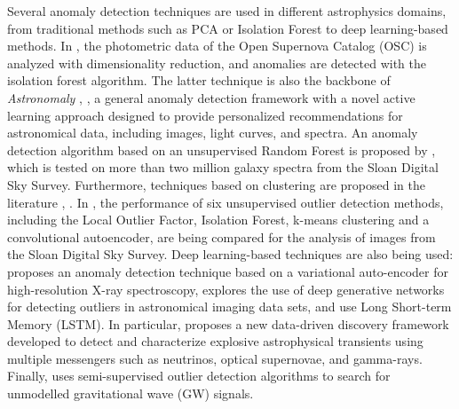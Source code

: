 Several anomaly detection techniques are used in different astrophysics domains, from traditional methods such as PCA or Isolation Forest to deep learning-based methods. In \cite{Pruzhinskaya_2019}, the photometric data of the Open Supernova Catalog (OSC) is analyzed with dimensionality reduction, and anomalies are detected with the isolation forest algorithm. The latter technique is also the backbone of \textit{Astronomaly} \cite{Webb_2020}, \cite{Lochner_2021}, a general anomaly detection framework with a novel active learning approach designed to provide personalized recommendations for astronomical data, including images, light curves, and spectra. An anomaly detection algorithm based on an unsupervised Random Forest is proposed by \cite{Baron_2017}, which is tested on more than two million galaxy spectra from the Sloan Digital Sky Survey. Furthermore, techniques based on clustering are proposed in the literature \cite{Sadr_2019}, \cite{Giles_2019}. In \cite{Doorenbos_2021}, the performance of six unsupervised outlier detection methods, including the Local Outlier Factor, Isolation Forest, k-means clustering and a convolutional autoencoder, are being compared for the analysis of images from the Sloan Digital Sky Survey. Deep learning-based techniques are also being used: \cite{Ichinohe_2019} proposes an anomaly detection technique based on a variational auto-encoder for high-resolution X-ray spectroscopy, \cite{Margalef_2020} explores the use of deep generative networks for detecting outliers in astronomical imaging data sets, \cite{Zhang_2018} and \cite{Sadeh_2020} use Long Short-term Memory (LSTM). In particular, \cite{Sadeh_2020} proposes a new data-driven discovery framework developed to detect and characterize explosive astrophysical transients using multiple messengers such as neutrinos, optical supernovae, and gamma-rays. Finally, \cite{Marianer_2021} uses semi-supervised outlier detection algorithms to search for unmodelled gravitational wave (GW) signals.
